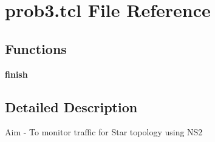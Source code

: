 \hypertarget{prob3_8tcl}{}\section{prob3.\+tcl File Reference}
\label{prob3_8tcl}
\subsection*{Functions}
\begin{DoxyCompactItemize}
\item 
\mbox{\label{prob3_8tcl_a30728837c246b65ef76298af0101d99c}} 
{\bfseries finish}
\end{DoxyCompactItemize}


\subsection{Detailed Description}
Aim -\/ To monitor traffic for Star topology using N\+S2 \begin{DoxyVerb}
\end{DoxyVerb}
